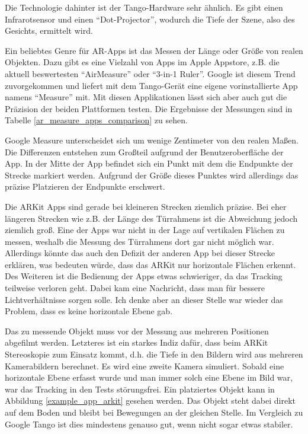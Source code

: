Die Technologie dahinter ist der Tango-Hardware sehr ähnlich. Es gibt einen Infrarotsensor und einen "`Dot-Projector"', wodurch die Tiefe der Szene, also des Gesichts, ermittelt wird. \cite{iphoneX_display}

Ein beliebtes Genre für AR-Apps ist das Messen der Länge oder Größe von realen Objekten. Dazu gibt es eine Vielzahl von Apps im Apple Appstore, z.B. die aktuell beswertesten "`AirMeasure"' oder "`3-in-1 Ruler"'. Google ist diesem Trend zuvorgekommen und liefert mit dem Tango-Gerät eine eigene vorinstallierte App namens "`Measure"' mit. Mit diesen Applikationen lässt sich aber auch gut die Präzision der beiden Plattformen testen. Die Ergebnisse der Messungen sind in Tabelle \ref{ar_measure_apps_comparison} zu sehen.

Google Measure unterscheidet sich um wenige Zentimeter von den realen Maßen. Die Differenzen entstehen zum Großteil aufgrund der Benutzeroberfläche der App. In der Mitte der App befindet sich ein Punkt mit dem die Endpunkte der Strecke markiert werden. Aufgrund der Größe dieses Punktes wird allerdings das präzise Platzieren der Endpunkte erschwert.

Die ARKit Apps sind gerade bei kleineren Strecken ziemlich präzise. Bei eher längeren Strecken wie z.B. der Länge des Türrahmens ist die Abweichung jedoch ziemlich groß. Eine der Apps war nicht in der Lage auf vertikalen Flächen zu messen, weshalb die Messung des Türrahmens dort gar nicht möglich war. Allerdings könnte das auch den Defizit der anderen App bei dieser Strecke erklären, was bedeuten würde, dass das ARKit nur horizontale Flächen erkennt. Des Weiteren ist die Bedienung der Apps etwas schwieriger, da das Tracking teilweise verloren geht. Dabei kam eine Nachricht, dass man für bessere Lichtverhältnisse sorgen solle. Ich denke aber an dieser Stelle war wieder das Problem, dass es keine horizontale Ebene gab. 

Das zu messende Objekt muss vor der Messung aus mehreren Positionen abgefilmt werden. Letzteres ist ein starkes Indiz dafür, dass beim ARKit Stereoskopie zum Einsatz kommt, d.h. die Tiefe in den Bildern wird aus mehreren Kamerabildern berechnet. Es wird eine zweite Kamera simuliert. Sobald eine horizontale Ebene erfasst wurde und man immer solch eine Ebene im Bild war, war das Tracking in den Tests störungsfrei. Ein platziertes Objekt kann in Abbildung \ref{example_app_arkit} gesehen werden. Das Objekt steht dabei direkt auf dem Boden und bleibt bei Bewegungen an der gleichen Stelle. Im Vergleich zu Google Tango ist dies mindestens genauso gut, wenn nicht sogar etwas stabiler.

